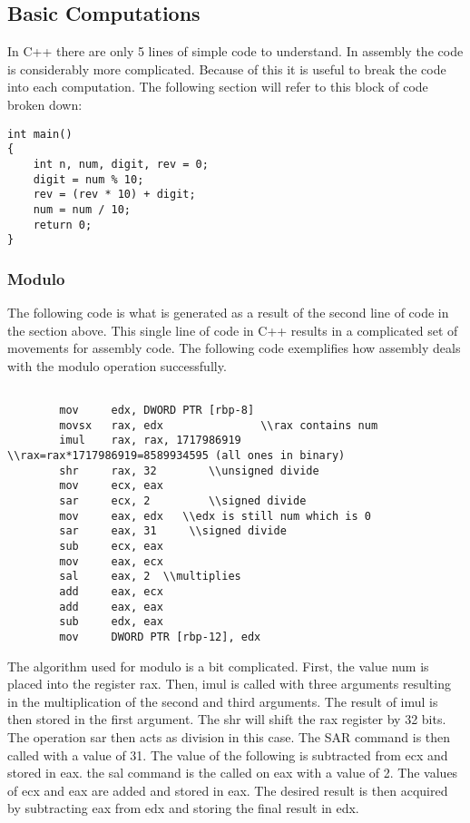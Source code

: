\documentclass{article}
\theoremstyle{theorem}
\theoremstyle{definition}
\theoremstyle{remark}
\begin{document}
\subsection{Basic Computations}
In C++ there are only 5 lines of simple code to understand. In assembly the code is considerably more complicated. Because of this it is useful to break the code into each computation. The following section will refer to this block of code broken down:
\begin{lstlisting}
int main()
{
    int n, num, digit, rev = 0;
    digit = num % 10;
    rev = (rev * 10) + digit;
    num = num / 10;
    return 0;
}
\end{lstlisting}


\subsubsection{{Modulo}}
The following code is what is generated as a result of the second line of code in the section above. This single line of code in C++ results in a complicated set of movements for assembly code. The following code exemplifies how assembly deals with the modulo operation successfully.
\begin{lstlisting}

        mov     edx, DWORD PTR [rbp-8] 
        movsx   rax, edx               \\rax contains num 
        imul    rax, rax, 1717986919    \\rax=rax*1717986919=8589934595 (all ones in binary)
        shr     rax, 32        \\unsigned divide       
        mov     ecx, eax
        sar     ecx, 2         \\signed divide
        mov     eax, edx   \\edx is still num which is 0
        sar     eax, 31     \\signed divide
        sub     ecx, eax 
        mov     eax, ecx 
        sal     eax, 2  \\multiplies
        add     eax, ecx  
        add     eax, eax
        sub     edx, eax
        mov     DWORD PTR [rbp-12], edx
\end{lstlisting}      

The algorithm used for modulo is a bit complicated. First, the value num is placed into the register rax. Then, imul is called with three arguments resulting in 
the multiplication of the second and third arguments. The result of imul is then stored in the first argument. The shr will shift the rax register by 32 bits. The operation sar then acts as division in this case. The SAR command is then called with a value of 31. The value of the following is subtracted from ecx and stored in eax. the sal command is the called on eax with a value of 2. The values of ecx and eax are added and stored in eax. The desired result is then acquired by subtracting eax from edx and storing the final result in edx. 
\end{document}
